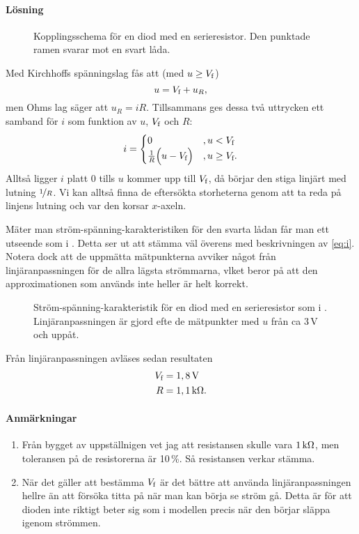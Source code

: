 \documentclass[11pt,a4paper, swedish
]{article}
\begin{document}
\paragraph{Lösning}
\begin{figure}
\centering

\caption{Kopplingsschema för en diod med en serieresistor. Den
  punktade ramen svarar mot en svart låda.}
\label{fig:LED_schematics}
\end{figure}
Med Kirchhoffs spänningslag fås att (med $u\ge V_\text{f}$)
\begin{equation}
u=V_\text{f}+u_R,
\end{equation}
men Ohms lag säger att $u_R=iR$. Tillsammans ges dessa två uttrycken
ett samband för $i$ som funktion av $u$, $V_\text{f}$ och $R$:
\begin{equation}\label{eq:i}
i=\begin{cases}
0 &, u<V_\text{f}\\
\frac{1}{R}\Big(u-V_\text{f}\Big)&, u\ge V_\text{f}.
\end{cases}
\end{equation}
Alltså ligger $i$ platt $0$ tills $u$ kommer upp till $V_\text{f}$, då börjar den stiga
linjärt med lutning $\nicefrac{1}{R}$. Vi kan alltså finna de
eftersökta storheterna genom att ta reda på linjens lutning och var
den korsar $x$-axeln.

Mäter man ström-spänning-karakteristiken för den svarta lådan får man
ett utseende som i . Detta ser ut att stämma väl
överens med beskrivningen av \eqref{eq:i}. Notera dock att de
uppmätta mätpunkterna avviker något från linjäranpassningen för de
allra lägsta strömmarna, vlket beror på att den approximationen som
används inte heller är helt korrekt. 

\begin{figure}
\centering

\caption{Ström-spänning-karakteristik för en diod med en serieresistor
som i . Linjäranpassningen är gjord efte de
mätpunkter med $u$ från ca 3\,V och uppåt.}
\label{fig:LED}
\end{figure}

Från linjäranpassningen avläses sedan resultaten
\begin{equation*}
\begin{aligned}
\Vf &= \unit[1,8]{V}\\
R &= \unit[1,1]{k\Omega}.
\end{aligned}
\end{equation*}
\paragraph{Anmärkningar} 
\begin{enumerate}
\item Från bygget av uppställnigen vet jag att resistansen skulle vara
  $\unit[1]{k\Omega}$, men toleransen på de resistorerna är 10\,\%. Så
  resistansen verkar stämma.
\item När det gäller att bestämma $V_\text{f}$ är det bättre att använda
  linjäranpassningen hellre än att försöka titta på när man kan börja
  se ström gå. Detta är för att dioden inte riktigt beter sig som i
  modellen precis när den börjar släppa igenom strömmen.
\end{enumerate}
\end{document}
